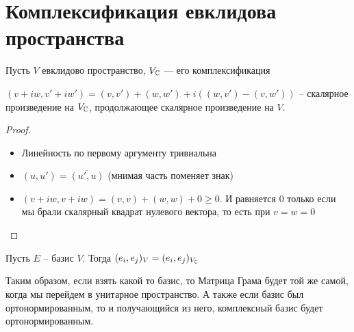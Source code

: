 \section{Комплексификация евклидова пространства}
\begin{theorem-non}
    Пусть $V$ евклидово пространство, $V_{\mathbb{C}}$ --- его комплексификация
    
    $(v + iw, v' + iw') = (v, v') + (w, w') + i((w, v') - (v, w'))$ -- скалярное произведение на $V_{\mathbb{C}}$, продолжающее 
    скалярное произведение на $V$.
    \end{theorem-non}
\begin{proof} \quad

    \begin{itemize}
        \item Линейность по первому аргументу тривиальна
        \item $(u, u') = \overline{(u', u)}$ (мнимая часть поменяет знак)
        \item $(v + iw, v + iw) = (v, v) + (w, w) + 0 \geqslant 0$. И равняется $0$ только если мы брали скалярный квадрат нулевого вектора, то есть при $v = w = 0$
    \end{itemize}
\end{proof}
\notice Пусть $E$ -- базис $V$. Тогда 
$(e_i, e_j)_V = (e_i, e_j)_{V_{\mathbb{C}}}$

Таким образом, если взять какой то базис, то Матрица Грама будет той же самой, когда мы перейдем в унитарное пространство. А также
если базис был ортонормированным, то и получающийся из него, комплексный базис будет ортонормированным. 